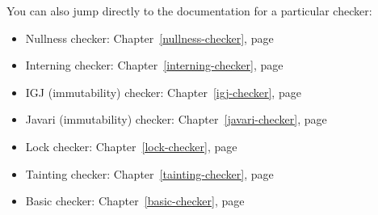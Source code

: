 \documentclass[10pt]{report}
\newcommand{\htmlhr}{\relax}
\begin{document}
\newcommand{\refwithpage}[1]{\ref{#1}, page~\pageref{#1}}
\newcommand{\chapterpageref}[1]{Chapter~\refwithpage{#1}}

\medskip

\noindent
You can also jump directly to the documentation for a particular checker:
\begin{itemize}
\item Nullness checker: \chapterpageref{nullness-checker}
\item Interning checker: \chapterpageref{interning-checker}
\item IGJ (immutability) checker: \chapterpageref{igj-checker}
\item Javari (immutability) checker: \chapterpageref{javari-checker}
\item Lock checker: \chapterpageref{lock-checker}
\item Tainting checker: \chapterpageref{tainting-checker}
\item Basic checker: \chapterpageref{basic-checker}
\end{itemize}


\tableofcontents
\newpage

















\htmlhr


\end{document}
